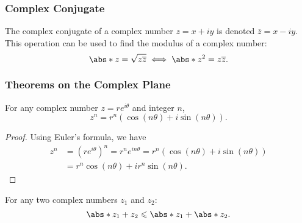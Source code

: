 \documentclass{article}
\begin{document}
\subsubsection{Complex Conjugate}
The complex conjugate of a complex number \(z = x + i y\) is denoted
\(\overline{z} = x - i y\). This operation can be used to find the
modulus of a complex number:
\begin{equation*}
    \abs*{z} = \sqrt{z \overline{z}} \iff \abs*{z}^2 = z \overline{z}.
\end{equation*}
\subsubsection{Theorems on the Complex Plane}
\begin{theorem}
    For any complex number \(z = r e^{i \theta}\) and integer \(n\),
    \begin{equation*}
        z^n = r^n \left( \cos{\left( n \theta \right)} + i \sin{\left( n \theta \right)} \right).
    \end{equation*}
\end{theorem}
\begin{proof}
    Using Euler's formula, we have
    \begin{align*}
        z^n & = \left( r e^{i \theta} \right)^n = r^n e^{i n \theta} = r^n \left( \cos{\left( n \theta \right)} + i \sin{\left( n \theta \right)} \right) \\
            & = r^n \cos{\left( n \theta \right)} + i r^n \sin{\left( n \theta \right)}.
    \end{align*}
\end{proof}
\begin{theorem}
    For any two complex numbers \(z_1\) and \(z_2\):
    \begin{equation*}
        \abs*{z_1 + z_2} \leqslant \abs*{z_1} + \abs*{z_2}.
    \end{equation*}
\end{theorem}
\end{document}
